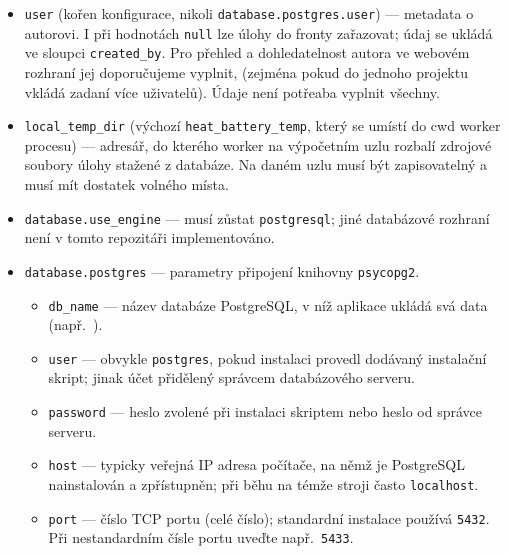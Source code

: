 \documentclass[a4paper,11pt]{article}
\begin{document}
\begin{itemize}
  \item \texttt{user} (kořen konfigurace, nikoli \texttt{database.postgres.user}) ---
        metadata o autorovi. I při hodnotách \texttt{null} lze úlohy do fronty
        zařazovat; údaj se ukládá ve sloupci \texttt{created\_by}. Pro přehled
        a dohledatelnost autora ve webovém rozhraní jej doporučujeme vyplnit,
        (zejména pokud do jednoho projektu vkládá zadaní více uživatelů).
        Údaje není potřeaba vyplnit všechny.
  \item \texttt{local\_temp\_dir} (výchozí \texttt{heat\_battery\_temp}, který 
        se umístí do cwd worker procesu) ---
        adresář, do kterého worker na výpočetním uzlu rozbalí zdrojové soubory
        úlohy stažené z databáze. Na daném uzlu musí být zapisovatelný a musí
        mít dostatek volného místa.
  \item \texttt{database.use\_engine} --- musí zůstat \texttt{postgresql};
        jiné databázové rozhraní není v tomto repozitáři implementováno.
  \item {}\label{sec:config-postgres}%
        \texttt{database.postgres} --- parametry připojení knihovny \texttt{psycopg2}.

        \begin{itemize}
          \item \texttt{db\_name} --- název databáze PostgreSQL, v níž aplikace
                ukládá svá data (např.\ ).
          \item \texttt{user} --- obvykle \texttt{postgres}, pokud instalaci provedl
                dodávaný instalační skript; jinak účet přidělený správcem databázového
                serveru.
          \item \texttt{password} --- heslo zvolené při instalaci skriptem nebo heslo
                od správce serveru.
          \item \texttt{host} --- typicky veřejná IP adresa počítače, na němž je
                PostgreSQL nainstalován a zpřístupněn; při běhu na témže stroji
                často \texttt{localhost}.
          \item \texttt{port} --- číslo TCP portu (celé číslo); standardní instalace
                používá \texttt{5432}. Při nestandardním čísle portu uveďte např.\
                \texttt{5433}.
        \end{itemize}

\end{itemize}
\end{document}
